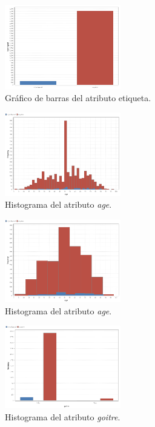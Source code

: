 \documentclass[osajnl,twocolumn,showpacs,superscriptaddress,10pt,floatfix]{revtex4-1} %
\begin{document}
\twocolumngrid

\begin{figure}[H]
    \centering
    \includegraphics[width=0.45\textwidth]{analysis/bars_hypothyroid}
    \caption{Gráfico de barras del atributo etiqueta.}
    \label{figure:bars_hypothyroid}
\end{figure}

\begin{figure}[H]
    \centering
    \includegraphics[width=0.45\textwidth]{analysis/histogram_age}
    \caption{Histograma del atributo \textit{age}.}
    \label{figure:histogram_age}
\end{figure}

\begin{figure}[H]
    \centering
    \includegraphics[width=0.45\textwidth]{analysis/histogram_age2}
    \caption{Histograma del atributo \textit{age}.}
    \label{figure:histogram_age2}
\end{figure}

\begin{figure}[H]
    \centering
    \includegraphics[width=0.45\textwidth]{analysis/histogram_goitre}
    \caption{Histograma del atributo \textit{goitre}.}
    \label{figure:histogram_goitre}
\end{figure}
\end{document}
